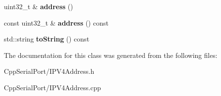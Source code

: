 \begin{DoxyCompactItemize}
uint32\+\_\+t \& {\bfseries address} ()
\item 
\mbox{\label{class_cpp_serial_port_1_1_i_p_v4_address_a5d25fb1563ac1a681e29609dd32f80ea}} 
const uint32\+\_\+t \& {\bfseries address} () const
\item 
\mbox{\label{class_cpp_serial_port_1_1_i_p_v4_address_a28de245ff940b05d2bb11f550d5ed5ab}} 
std\+::string {\bfseries to\+String} () const
\end{DoxyCompactItemize}


The documentation for this class was generated from the following files\+:\begin{DoxyCompactItemize}
\item 
Cpp\+Serial\+Port/I\+P\+V4\+Address.\+h\item 
Cpp\+Serial\+Port/I\+P\+V4\+Address.\+cpp\end{DoxyCompactItemize}
